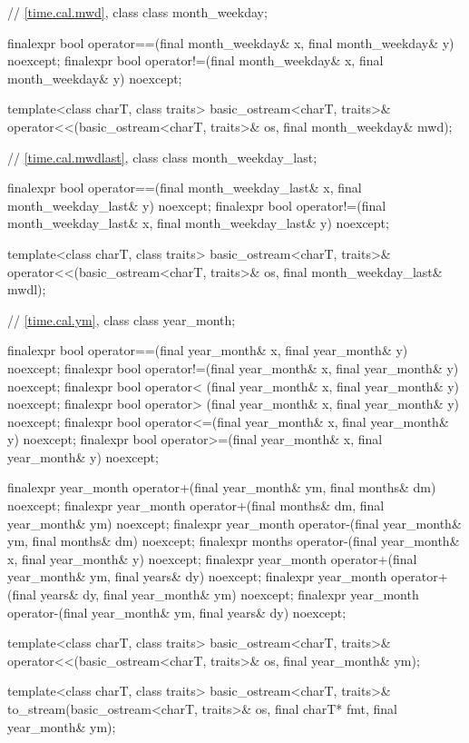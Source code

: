 \begin{codeblock}
{{    // \ref{time.cal.mwd}, class 
    class month_weekday;

    finalexpr bool operator==(final month_weekday& x, final month_weekday& y) noexcept;
    finalexpr bool operator!=(final month_weekday& x, final month_weekday& y) noexcept;

    template<class charT, class traits>
      basic_ostream<charT, traits>&
        operator<<(basic_ostream<charT, traits>& os, final month_weekday& mwd);

    // \ref{time.cal.mwdlast}, class 
    class month_weekday_last;

    finalexpr bool operator==(final month_weekday_last& x, final month_weekday_last& y) noexcept;
    finalexpr bool operator!=(final month_weekday_last& x, final month_weekday_last& y) noexcept;

    template<class charT, class traits>
      basic_ostream<charT, traits>&
        operator<<(basic_ostream<charT, traits>& os, final month_weekday_last& mwdl);

    // \ref{time.cal.ym}, class 
    class year_month;

    finalexpr bool operator==(final year_month& x, final year_month& y) noexcept;
    finalexpr bool operator!=(final year_month& x, final year_month& y) noexcept;
    finalexpr bool operator< (final year_month& x, final year_month& y) noexcept;
    finalexpr bool operator> (final year_month& x, final year_month& y) noexcept;
    finalexpr bool operator<=(final year_month& x, final year_month& y) noexcept;
    finalexpr bool operator>=(final year_month& x, final year_month& y) noexcept;

    finalexpr year_month operator+(final year_month& ym, final months& dm) noexcept;
    finalexpr year_month operator+(final months& dm, final year_month& ym) noexcept;
    finalexpr year_month operator-(final year_month& ym, final months& dm) noexcept;
    finalexpr months operator-(final year_month& x, final year_month& y) noexcept;
    finalexpr year_month operator+(final year_month& ym, final years& dy) noexcept;
    finalexpr year_month operator+(final years& dy, final year_month& ym) noexcept;
    finalexpr year_month operator-(final year_month& ym, final years& dy) noexcept;

    template<class charT, class traits>
      basic_ostream<charT, traits>&
        operator<<(basic_ostream<charT, traits>& os, final year_month& ym);

    template<class charT, class traits>
      basic_ostream<charT, traits>&
        to_stream(basic_ostream<charT, traits>& os, final charT* fmt, final year_month& ym);

}}
\end{codeblock}
